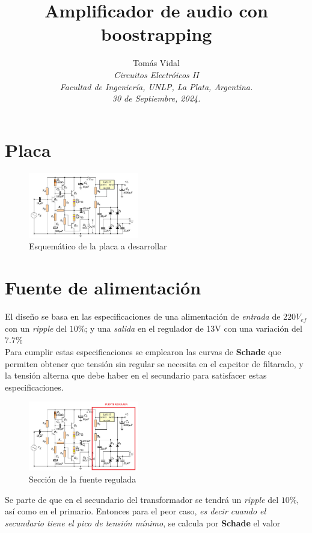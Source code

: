 \documentclass[letterpaper, 10 pt, conference]{ieeeconf}  %
\title{\LARGE \bf Amplificador de audio con boostrapping}
\author{
  Tom\'as Vidal\\
  {\it Circuitos Electróicos II}\\
  {\it Facultad de Ingenier\'ia, UNLP, La Plata, Argentina.}\\
  {\it 30 de Septiembre, 2024.}
}                                            %
\begin{document}
\maketitle
\thispagestyle{empty}
\pagestyle{empty}

\section{Placa}
\begin{figure}[H]
  \centering
  \includegraphics[width=0.43\textwidth]{./imagenes/placa.png}
  \caption{Esquemático de la placa a desarrollar}
  \label{fig:placa}
\end{figure}


\section{Fuente de alimentación}
El diseño se basa en las especificaciones de una alimentación de \textit{entrada} de $220V_{ef}$ con un \textit{ripple} del $10\%$; y una \textit{salida} en el regulador de 13V con una variación del $7.7\%$ \\
\hspace{10em} Para cumplir estas especificaciones se emplearon las curvas de \textbf{Schade} que permiten obtener que tensión sin regular se necesita en el capcitor de filtarado, y la tensión alterna que debe haber en el secundario para satisfacer estas especificaciones.
\begin{figure}[H]
  \centering
  \includegraphics[width=0.43\textwidth]{./imagenes/placa_fuente.png}
  \caption{Sección de la fuente regulada}
  \label{fig:placa_fuente}
\end{figure}

Se parte de que en el secundario del transformador se tendrá un \textit{ripple} del $10\%$, así como en el primario. Entonces para el peor caso, \textit{es decir cuando el secundario tiene el pico de tensión mínimo}, se calcula por \textbf{Schade} el valor
\end{document}
